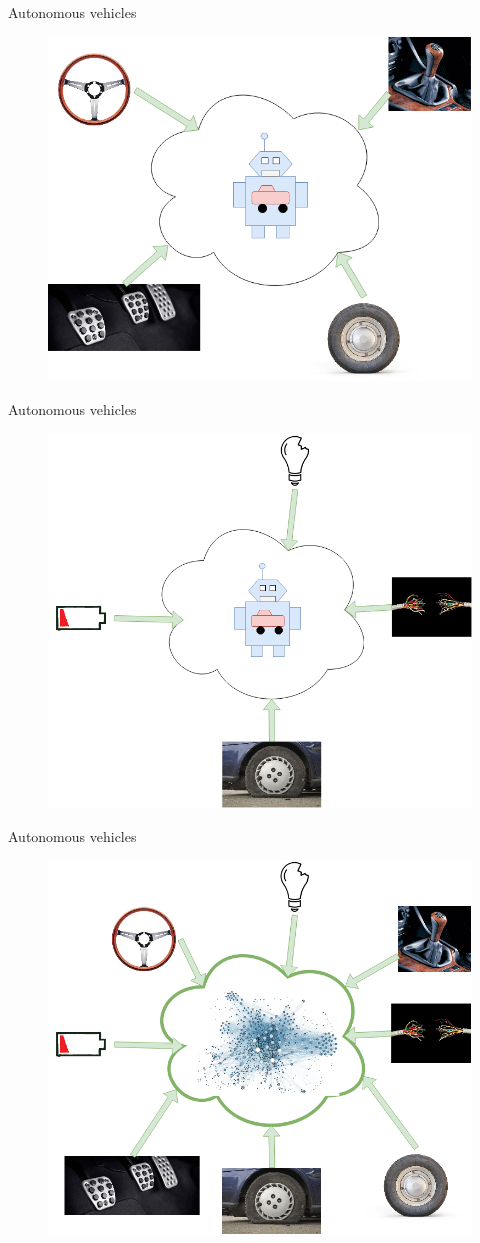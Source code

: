 \documentclass{beamer}
\begin{document}
\begin{frame}{Autonomous vehicles}
    \begin{figure}
        \includegraphics[width=0.7\linewidth]{driving.png}
    \end{figure}
\end{frame}

\begin{frame}{Autonomous vehicles}
    \begin{figure}
        \includegraphics[width=0.7\linewidth]{monitoring.png}
    \end{figure}
\end{frame}

\begin{frame}{Autonomous vehicles}
    \begin{figure}
        \includegraphics[width=0.7\linewidth]{networking.png}
    \end{figure}
\end{frame}
\end{document}
